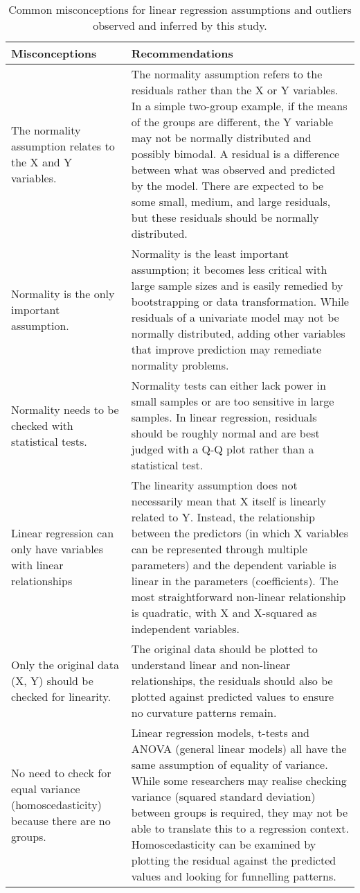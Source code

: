 \begin{table}[H]
\begin{widestuff}
\caption{Common misconceptions for linear regression assumptions and outliers observed and inferred by this study.} 
\begin{tabular}{p{5cm}p{13cm}}
  \toprule
{\bf Misconceptions} & {\bf Recommendations} \\ 
  \midrule
The normality assumption relates to the X and Y variables. & The normality assumption refers to the residuals rather than the X or Y variables.  In a simple two-group example, if the means of the groups are different, the Y variable may not be normally distributed and possibly bimodal.  A residual is a difference between what was observed and predicted by the model. There are expected to be some small, medium, and large residuals, but these residuals should be normally distributed. \\ 
  Normality is the only important assumption. & Normality is the least important assumption; it becomes less critical with large sample sizes and is easily remedied by bootstrapping or data transformation.  While residuals of a univariate model may not be normally distributed, adding other variables that improve prediction may remediate normality problems. \\ 
  Normality needs to be checked with statistical tests. & Normality tests can either lack power in small samples or are too sensitive in large samples. In linear regression, residuals should be roughly normal and are best judged with a Q-Q plot rather than a statistical test. \\ 
  Linear regression can only have variables with linear relationships & The linearity assumption does not necessarily mean that X itself is linearly related to Y. Instead, the relationship between the predictors (in which X variables can be represented through multiple parameters) and the dependent variable is linear in the parameters (coefficients). The most straightforward non-linear relationship is quadratic, with X and X-squared as independent variables. \\ 
  Only the original data (X, Y) should be checked for linearity. & The original data should be plotted to understand linear and non-linear relationships, the residuals should also be plotted against predicted values to ensure no curvature patterns remain. \\ 
  No need to check for equal variance (homoscedasticity) because there are no groups. & Linear regression models, t-tests and ANOVA (general linear models) all have the same assumption of equality of variance. While some researchers may realise checking variance (squared standard deviation) between groups is required, they may not be able to translate this to a regression context. Homoscedasticity can be examined by plotting the residual against the predicted values and looking for funnelling patterns. \\ 

\end{tabular}
\end{widestuff}
\end{table}
